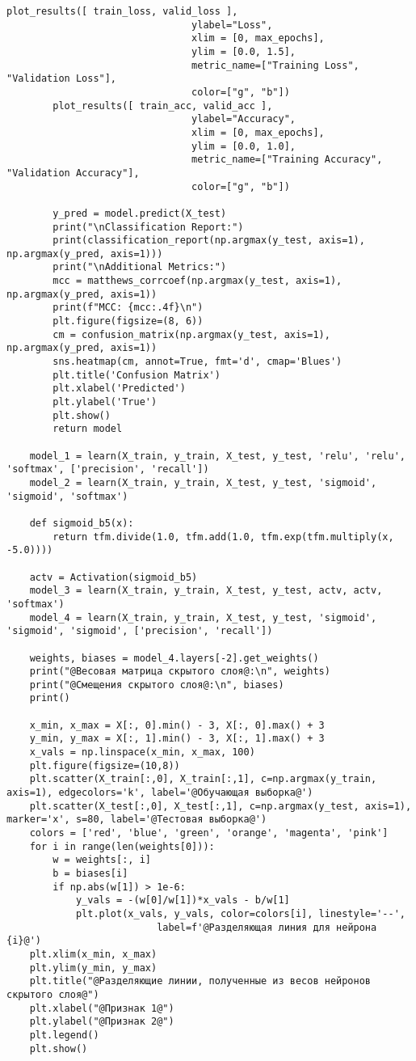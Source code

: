 \begin{lstlisting}[label=lst:1,caption=Классификация с использованием нейросетевого подхода]
		plot_results([ train_loss, valid_loss ],
								ylabel="Loss",
								xlim = [0, max_epochs],
								ylim = [0.0, 1.5],
								metric_name=["Training Loss", "Validation Loss"],
								color=["g", "b"])
		plot_results([ train_acc, valid_acc ],
								ylabel="Accuracy",
								xlim = [0, max_epochs],
								ylim = [0.0, 1.0],
								metric_name=["Training Accuracy", "Validation Accuracy"],
								color=["g", "b"])
		
		y_pred = model.predict(X_test)
		print("\nClassification Report:")
		print(classification_report(np.argmax(y_test, axis=1), np.argmax(y_pred, axis=1)))
		print("\nAdditional Metrics:")
		mcc = matthews_corrcoef(np.argmax(y_test, axis=1), np.argmax(y_pred, axis=1))
		print(f"MCC: {mcc:.4f}\n")
		plt.figure(figsize=(8, 6))
		cm = confusion_matrix(np.argmax(y_test, axis=1), np.argmax(y_pred, axis=1))
		sns.heatmap(cm, annot=True, fmt='d', cmap='Blues')
		plt.title('Confusion Matrix')
		plt.xlabel('Predicted')
		plt.ylabel('True')
		plt.show()
		return model
	
	model_1 = learn(X_train, y_train, X_test, y_test, 'relu', 'relu', 'softmax', ['precision', 'recall'])
	model_2 = learn(X_train, y_train, X_test, y_test, 'sigmoid', 'sigmoid', 'softmax')

	def sigmoid_b5(x):
		return tfm.divide(1.0, tfm.add(1.0, tfm.exp(tfm.multiply(x, -5.0))))
	
	actv = Activation(sigmoid_b5)
	model_3 = learn(X_train, y_train, X_test, y_test, actv, actv, 'softmax')
	model_4 = learn(X_train, y_train, X_test, y_test, 'sigmoid', 'sigmoid', 'sigmoid', ['precision', 'recall'])
	
	weights, biases = model_4.layers[-2].get_weights()
	print("@Весовая матрица скрытого слоя@:\n", weights)
	print("@Смещения скрытого слоя@:\n", biases)
	print()
	
	x_min, x_max = X[:, 0].min() - 3, X[:, 0].max() + 3
	y_min, y_max = X[:, 1].min() - 3, X[:, 1].max() + 3
	x_vals = np.linspace(x_min, x_max, 100)
	plt.figure(figsize=(10,8))
	plt.scatter(X_train[:,0], X_train[:,1], c=np.argmax(y_train, axis=1), edgecolors='k', label='@Обучающая выборка@')
	plt.scatter(X_test[:,0], X_test[:,1], c=np.argmax(y_test, axis=1), marker='x', s=80, label='@Тестовая выборка@')
	colors = ['red', 'blue', 'green', 'orange', 'magenta', 'pink']
	for i in range(len(weights[0])):
		w = weights[:, i]
		b = biases[i]
		if np.abs(w[1]) > 1e-6:
			y_vals = -(w[0]/w[1])*x_vals - b/w[1]
			plt.plot(x_vals, y_vals, color=colors[i], linestyle='--',
						  label=f'@Разделяющая линия для нейрона {i}@')
	plt.xlim(x_min, x_max)
	plt.ylim(y_min, y_max)
	plt.title("@Разделяющие линии, полученные из весов нейронов скрытого слоя@")
	plt.xlabel("@Признак 1@")
	plt.ylabel("@Признак 2@")
	plt.legend()
	plt.show()
	

\end{lstlisting}
